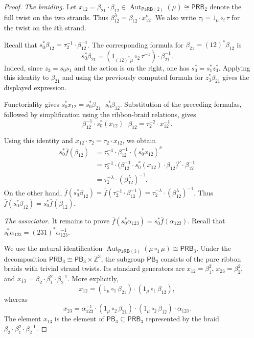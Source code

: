 \documentclass{amsart}
\newcommand{\PaRB}{\mathsf{PaRB}}
\newcommand{\Aut}{\operatorname{Aut}}
\newcommand{\PB}{\mathsf{PB}} %
\newcommand{\PRB}{\mathsf{PRB}} %
\theoremstyle{definition}
\numberwithin{equation}{section}
\begin{document}
\begin{proof}
\smallskip
\noindent\emph{The braiding.}
Let $x_{12}=\beta_{21}\cdot\beta_{12} \in\Aut_{\PaRB(2)}(\mu)\cong \PRB_2$ denote the full twist on the two strands. Thus $\beta_{12}^\lambda=\beta_{12}\cdot x_{12}^\nu$. We also write $\tau_i=1_\mu\circ_i\tau$ for the twist on the $i$th strand.

Recall that $s_0^*\beta_{12}=\tau_2^{-1}\cdot\beta_{12}^{-1}$. The corresponding formula for $\beta_{21}=(12)^*\beta_{12}$ is
\[
s_0^*\beta_{21}= (1_{(12)^*\mu}\circ_2\tau^{-1}) \cdot\beta_{21}^{-1}.
\]
Indeed, since $z_3=s_0s_1$ and the action is on the right, one has $s_0^*=s_1^*z_3^*$. Applying this identity to $\beta_{21}$ and using the previously computed formula for $z_3^*\beta_{21}$ gives the displayed expression.


Functoriality gives
$s_0^*x_{12}
=s_0^*\beta_{21}\cdot s_0^*\beta_{12}$.
Substitution of the preceding formulas, followed by simplification
using the ribbon-braid relations, gives
\begin{equation}
\label{eq: s0 action conjugated full twist}
\beta_{12}^{-1}\cdot s_0^*(x_{12})\cdot\beta_{12}
=
\tau_2^{-2}\cdot x_{12}^{-1}.
\end{equation}

Using this identity and
$x_{12}\cdot\tau_2=\tau_2\cdot x_{12}$, we obtain
\[
\begin{aligned}
s_0^*\bar f(\beta_{12})
&=
\tau_2^{-1}\cdot\beta_{12}^{-1}
\cdot(s_0^*x_{12})^\nu\\
&=
\tau_2^{-1}\cdot
\bigl(
\beta_{12}^{-1}\cdot s_0^*(x_{12})\cdot\beta_{12}
\bigr)^\nu
\cdot\beta_{12}^{-1}\\
&=
\tau_2^{-\lambda}\cdot
(\beta_{12}^\lambda)^{-1}.
\end{aligned}
\]
On the other hand,
$\bar f(s_0^*\beta_{12})
=\bar f(\tau_2^{-1}\cdot\beta_{12}^{-1})
=\tau_2^{-\lambda}\cdot(\beta_{12}^\lambda)^{-1}$.
Thus
$\bar f(s_0^*\beta_{12})=s_0^*\bar f(\beta_{12})$.

\smallskip
\noindent\emph{The associator.}
It remains to prove
$\bar f(s_0^*\alpha_{123})=s_0^*\bar f(\alpha_{123})$.
Recall that
$s_0^*\alpha_{123}=(231)^*\alpha_{123}^{-1}$.

We use the natural identification
$\Aut_{\PaRB(3)}(\mu\circ_1\mu)\cong\PRB_3$. Under the decomposition
$\PRB_3\cong\PB_3\times\mathbb Z^3$, the subgroup $\PB_3$ consists
of the pure ribbon braids with trivial strand twists. Its standard
generators are
$x_{12}=\beta_1^2$, $x_{23}=\beta_2^2$, and
$x_{13}=\beta_2\cdot\beta_1^2\cdot\beta_2^{-1}$.
More explicitly,
\[
x_{12}
=
(1_\mu\circ_1\beta_{21})
\cdot(1_\mu\circ_1\beta_{12}),
\]
whereas
\[
x_{23}
=
\alpha_{123}^{-1}
\cdot(1_\mu\circ_2\beta_{21})
\cdot(1_\mu\circ_2\beta_{12})
\cdot\alpha_{123}.
\]
The element $x_{13}$ is the element of
$\PB_3\subseteq\PRB_3$ represented by the braid
$\beta_2\cdot\beta_1^2\cdot\beta_2^{-1}$.


\end{proof}
\end{document}

